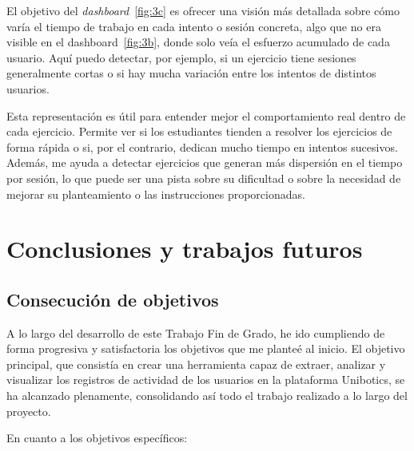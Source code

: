 \documentclass[a4paper, 12pt]{book}
\begin{document}
El objetivo del \textit{dashboard}~\ref{fig:3c} es ofrecer una visión más detallada sobre cómo varía el tiempo de trabajo en cada intento o sesión concreta, algo que no era visible en el dashboard~\ref{fig:3b}, donde solo veía el esfuerzo acumulado de cada usuario. Aquí puedo detectar, por ejemplo, si un ejercicio tiene sesiones generalmente cortas o si hay mucha variación entre los intentos de distintos usuarios.

Esta representación es útil para entender mejor el comportamiento real dentro de cada ejercicio. Permite ver si los estudiantes tienden a resolver los ejercicios de forma rápida o si, por el contrario, dedican mucho tiempo en intentos sucesivos. Además, me ayuda a detectar ejercicios que generan más dispersión en el tiempo por sesión, lo que puede ser una pista sobre su dificultad o sobre la necesidad de mejorar su planteamiento o las instrucciones proporcionadas.


\cleardoublepage



\chapter{Conclusiones y trabajos futuros}
\label{chap:conclusiones}


\section{Consecución de objetivos}
\label{sec:consecucion-objetivos}

A lo largo del desarrollo de este Trabajo Fin de Grado, he ido cumpliendo de forma progresiva y satisfactoria los objetivos que me planteé al inicio. El objetivo principal, que consistía en crear una herramienta capaz de extraer, analizar y visualizar los registros de actividad de los usuarios en la plataforma Unibotics, se ha alcanzado plenamente, consolidando así todo el trabajo realizado a lo largo del proyecto.

En cuanto a los objetivos específicos:
\end{document}
